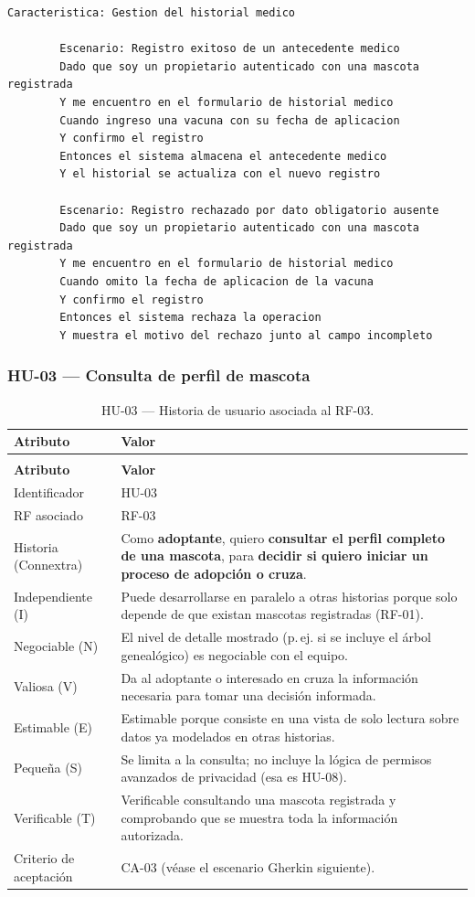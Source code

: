 \documentclass[journal,onecolumn]{IEEEtran}
\makeatletter
\newenvironment{atributos}[2]{%
	\small
	\begin{longtable}{@{}>{\raggedright\arraybackslash}p{4.2cm} >{\raggedright\arraybackslash}p{11.2cm}@{}}
		\caption{#2}\label{tab:#1}\\
		\toprule
		\textbf{Atributo} & \textbf{Valor} \\
		\midrule
		\endfirsthead
		\multicolumn{2}{@{}l}{\small\itshape (continuación)}\\
		\toprule
		\textbf{Atributo} & \textbf{Valor} \\
		\midrule
		\endhead
		\bottomrule
		\endlastfoot
	}{%
	\end{longtable}
	\normalsize
}
\makeatother
\begin{document}
	\begin{lstlisting}[style=gherkin,caption={CA-02 --- Escenario de aceptación de la historia HU-02.},label={lst:ca02}]
		Caracteristica: Gestion del historial medico
		
		Escenario: Registro exitoso de un antecedente medico
		Dado que soy un propietario autenticado con una mascota registrada
		Y me encuentro en el formulario de historial medico
		Cuando ingreso una vacuna con su fecha de aplicacion
		Y confirmo el registro
		Entonces el sistema almacena el antecedente medico
		Y el historial se actualiza con el nuevo registro
		
		Escenario: Registro rechazado por dato obligatorio ausente
		Dado que soy un propietario autenticado con una mascota registrada
		Y me encuentro en el formulario de historial medico
		Cuando omito la fecha de aplicacion de la vacuna
		Y confirmo el registro
		Entonces el sistema rechaza la operacion
		Y muestra el motivo del rechazo junto al campo incompleto
	\end{lstlisting}
	
	\subsubsection{HU-03 --- Consulta de perfil de mascota}
	
	\begin{atributos}{HU-03}{HU-03 --- Historia de usuario asociada al RF-03.}
		Identificador & HU-03 \\
		RF asociado & RF-03 \\
		Historia (Connextra) & Como \textbf{adoptante}, quiero \textbf{consultar el perfil completo de una mascota}, para \textbf{decidir si quiero iniciar un proceso de adopción o cruza}. \\
		Independiente (I) & Puede desarrollarse en paralelo a otras historias porque solo depende de que existan mascotas registradas (RF-01). \\
		Negociable (N) & El nivel de detalle mostrado (p.\,ej. si se incluye el árbol genealógico) es negociable con el equipo. \\
		Valiosa (V) & Da al adoptante o interesado en cruza la información necesaria para tomar una decisión informada. \\
		Estimable (E) & Estimable porque consiste en una vista de solo lectura sobre datos ya modelados en otras historias. \\
		Pequeña (S) & Se limita a la consulta; no incluye la lógica de permisos avanzados de privacidad (esa es HU-08). \\
		Verificable (T) & Verificable consultando una mascota registrada y comprobando que se muestra toda la información autorizada. \\
		Criterio de aceptación & CA-03 (véase el escenario Gherkin siguiente). \\
	\end{atributos}
	
\end{document}
